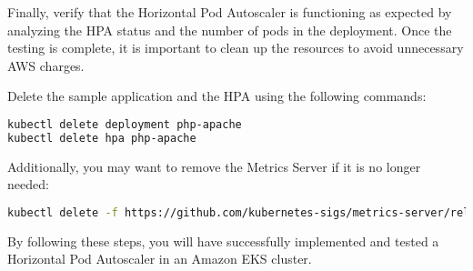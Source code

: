 Finally, verify that the Horizontal Pod Autoscaler is functioning as expected by analyzing the HPA status and the number of pods in the deployment. Once the testing is complete, it is important to clean up the resources to avoid unnecessary AWS charges.

Delete the sample application and the HPA using the following commands:

\begin{lstlisting}[language=bash]
kubectl delete deployment php-apache
kubectl delete hpa php-apache
\end{lstlisting}

Additionally, you may want to remove the Metrics Server if it is no longer needed:

\begin{lstlisting}[language=bash]
kubectl delete -f https://github.com/kubernetes-sigs/metrics-server/releases/latest/download/components.yaml
\end{lstlisting}

By following these steps, you will have successfully implemented and tested a Horizontal Pod Autoscaler in an Amazon EKS cluster.
